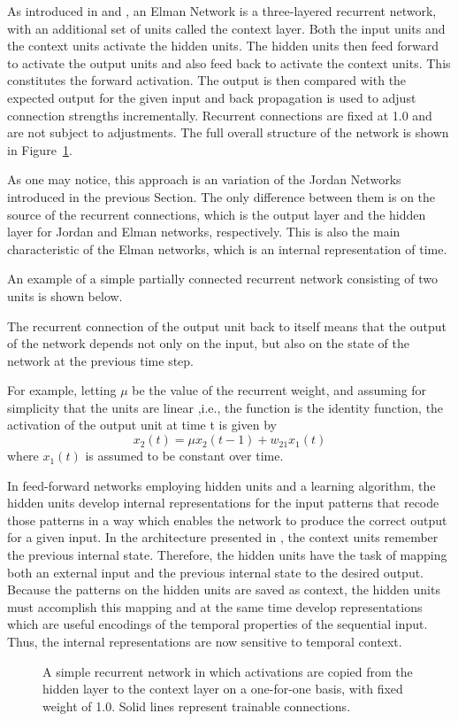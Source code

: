 As introduced in \cite{elman1989representation} and \cite{elman1990finding}, an Elman Network is a three-layered recurrent network, with an additional set of units called the context layer. Both the input units and the context units activate the hidden units. The hidden units then feed forward to activate the output units and also feed back to activate the context units. This constitutes the forward activation. The output is then compared with the expected output for the given input and back propagation is used to adjust connection strengths incrementally. Recurrent connections are fixed at 1.0 and are not subject to adjustments.  The full overall structure of the network is shown in Figure~\ref{fig:elman}.

As one may notice, this approach is an variation of the Jordan Networks introduced in the previous Section. The only difference between them is on the source of the recurrent connections, which is the output layer and the hidden layer for Jordan and Elman networks, respectively. This is also the main characteristic of the Elman networks, which is an internal representation of time.

\newpage
\vspace*{\fill}
\begin{tcolorbox}
\begin{example}
\label{example:simplern}
\normalfont
An example of a simple partially connected recurrent network consisting of two units is shown below. 
\begin{center}
\scalebox{1.0}{\simplernn}
\end{center}
The recurrent connection of the output unit back to itself means that the output of the network depends not only on the input, but also on the state of the network at the previous time step.
\bigskip

For example, letting $\mu$ be the value of the recurrent weight, and assuming for simplicity that the units are linear ,i.e., the function is the identity function, the activation of the output unit at time t is given by
\[
x_2(t) = \mu x_2(t-1) + w_{21}x_1(t)
\]
where $x_1(t)$ is assumed to be constant over time. \\
\end{example}
\end{tcolorbox}
\vspace*{\fill}
\newpage

In feed-forward networks employing hidden units and a learning algorithm, the hidden units develop internal representations for the input patterns that recode those patterns in a way which enables the network to produce the correct output for a given input. In the architecture presented in \cite{elman1989representation}, the context units remember the previous internal state. Therefore, the hidden units have the task of mapping both an external input and the previous internal state to the desired output. Because the patterns on the hidden units are saved as context, the hidden units must accomplish this mapping and at the same time develop representations which are useful encodings of the temporal properties of the sequential input. Thus, the internal representations are now sensitive to temporal context.

\begin{figure}
\centering
\scalebox{1.0}{\elmangeneral}
\caption{\label{fig:elman}A simple recurrent network in which activations are copied from the hidden layer to the context layer on a one-for-one basis, with fixed weight of 1.0. Solid lines represent trainable connections.}
\end{figure}